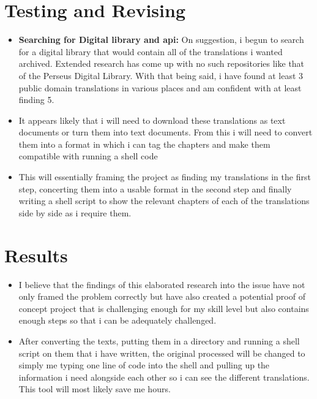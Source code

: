 \documentclass{article}
\begin{document}
\section{Testing and Revising}

\begin{itemize}
\item{\textbf{Searching for Digital library and api:} On suggestion, i begun to search for a digital library that would contain all of the translations i wanted archived. Extended research has come up with no such repositories like that of the Perseus Digital Library. With that being said, i have found at least 3 public domain translations in various places and am confident with at least finding 5.}

\item{It appears likely that i will need to download these translations as text documents or turn them into text documents. From this i will need to convert them into a format in which i can tag the chapters and make them compatible with running a shell code}

\item{This will essentially framing the project as finding my translations in the first step, concerting them into a usable format in the second step and finally writing a shell script to show the relevant chapters of each of the translations side by side as i require them.}



\end{itemize}





\section{Results}


\begin{itemize}

\item{I believe that the findings of this elaborated research into the issue have not only framed the problem correctly but have also created a potential proof of concept project that is challenging enough for my skill level but also contains enough steps so that i can be adequately challenged.}

\item{After converting the texts, putting them in a directory and running a shell script on them that i have written, the original processed will be changed to simply me typing one line of code into the shell and pulling up the information i need alongside each other so i can see the different translations. This tool will most likely save me hours.}



\end{itemize}
\end{document}
